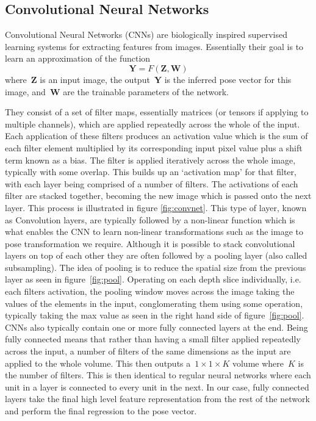 \documentclass[11pt]{article} %
\begin{document}
\subsection{Convolutional Neural Networks}

Convolutional Neural Networks (CNNs) are biologically inspired supervised learning systems for extracting features from images. Essentially their goal is to learn an approximation of the function
\begin{equation}
\boldsymbol{Y} = F(\boldsymbol{Z},\boldsymbol{W})
\label{eq:networkF}
\end{equation}
where~$\boldsymbol{Z}$ is an input image, the output~$\boldsymbol{Y}$ is the inferred pose vector for this image, and~$\boldsymbol{W}$ are the trainable parameters of the network. 
 
They consist of a set of filter maps, essentially matrices (or tensors if applying to multiple channels), which are applied repeatedly across the whole of the input. Each application of these filters produces an activation value which is the sum of each filter element multiplied by its corresponding input pixel value plus a shift term known as a bias. The filter is applied iteratively across the whole image, typically with some overlap. This builds up an `activation map' for that filter, with each layer being comprised of a number of filters. The activations of each filter are stacked together, becoming the new image which is passed onto the next layer. This process is illustrated in figure \ref{fig:convnet}. This type of layer, known as Convolution layers, are typically followed by a non-linear function which is what enables the CNN to learn non-linear transformations such as the image to pose transformation we require. Although it is possible to stack convolutional layers on top of each other they are often followed by a pooling layer (also called subsampling). The idea of pooling is to reduce the spatial size from the previous layer as seen in figure~\ref{fig:pool}. Operating on each depth slice individually, i.e. each filters activation, the pooling window moves across the image taking the values of the elements in the input, conglomerating them using some operation, typically taking the max value as seen in the right hand side of figure~\ref{fig:pool}. CNNs also typically contain one or more fully connected layers at the end. Being fully connected means that rather than having a small filter applied repeatedly across the input, a number of filters of the same dimensions as the input are applied to the whole volume. This then outputs a~$1\times 1 \times K$ volume where~$K$ is the number of filters. This is then identical to regular neural networks where each unit in a layer is connected to every unit in the next. In our case, fully connected layers take the final high level feature representation from the rest of the network and perform the final regression to the pose vector. 
\end{document}
